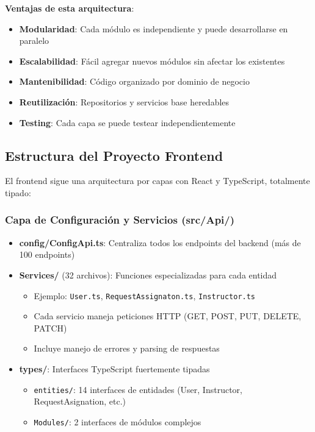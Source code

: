 \textbf{Ventajas de esta arquitectura}:
\begin{itemize}
    \item \textbf{Modularidad}: Cada módulo es independiente y puede desarrollarse en paralelo
    \item \textbf{Escalabilidad}: Fácil agregar nuevos módulos sin afectar los existentes
    \item \textbf{Mantenibilidad}: Código organizado por dominio de negocio
    \item \textbf{Reutilización}: Repositorios y servicios base heredables
    \item \textbf{Testing}: Cada capa se puede testear independientemente
\end{itemize}

\subsection{Estructura del Proyecto Frontend}

El frontend sigue una arquitectura por capas con React y TypeScript, totalmente tipado:

\subsubsection{Capa de Configuración y Servicios (src/Api/)}

\begin{itemize}
    \item \textbf{config/ConfigApi.ts}: Centraliza todos los endpoints del backend (más de 100 endpoints)
    \item \textbf{Services/} (32 archivos): Funciones especializadas para cada entidad
    \begin{itemize}
        \item Ejemplo: \texttt{User.ts}, \texttt{RequestAssignaton.ts}, \texttt{Instructor.ts}
        \item Cada servicio maneja peticiones HTTP (GET, POST, PUT, DELETE, PATCH)
        \item Incluye manejo de errores y parsing de respuestas
    \end{itemize}
    \item \textbf{types/}: Interfaces TypeScript fuertemente tipadas
    \begin{itemize}
        \item \texttt{entities/}: 14 interfaces de entidades (User, Instructor, RequestAsignation, etc.)
        \item \texttt{Modules/}: 2 interfaces de módulos complejos
    \end{itemize}
\end{itemize}


